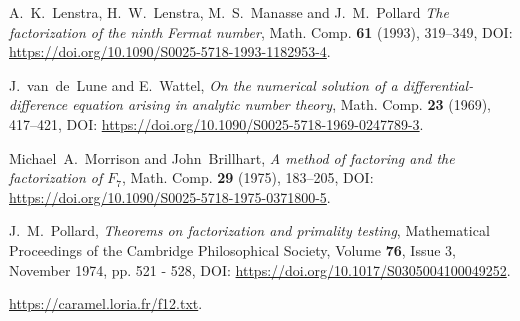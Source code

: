 \documentclass[a4paper, 11pt, pdftex]{report}
\theoremstyle{plain}
\theoremstyle{definition}
\begin{document}
\begin{thebibliography}{99}
 A.~K.~Lenstra, H.~W.~Lenstra, M.~S.~Manasse and J.~M.~Pollard
\emph{The factorization of the ninth Fermat number}, Math. Comp. \textbf{61} (1993), 319--349,
DOI: \url{https://doi.org/10.1090/S0025-5718-1993-1182953-4}.

 J.~van~de~Lune and E.~Wattel, \emph{On the numerical solution of a
differential-difference equation arising in analytic number theory}, Math. Comp. \textbf{23}
(1969), 417--421, DOI: \url{https://doi.org/10.1090/S0025-5718-1969-0247789-3}.

 Michael~A.~Morrison and John~Brillhart, \emph{A method of factoring
and the factorization of $F_7$}, Math. Comp. \textbf{29} (1975), 183--205,
DOI: \url{https://doi.org/10.1090/S0025-5718-1975-0371800-5}.

 J.~M.~Pollard, \emph{Theorems on factorization and  primality testing},
Mathematical Proceedings of the Cambridge Philosophical Society, Volume \textbf{76}, Issue 3,
November 1974, pp. 521 - 528, DOI: \url{https://doi.org/10.1017/S0305004100049252}.

 \url{https://caramel.loria.fr/f12.txt}.

\end{thebibliography}
\end{document}
